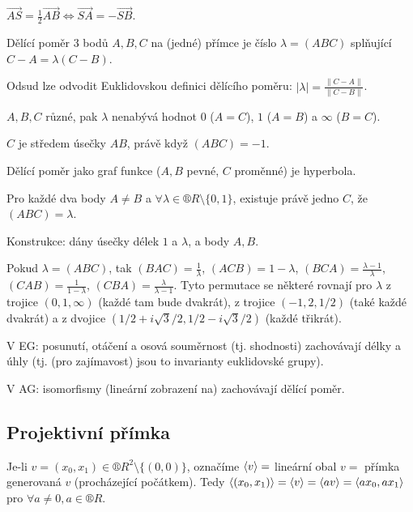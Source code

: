 \documentclass[12pt]{article}					%
\begin{document}
\begin{poznamka}
	$\vec{AS} = \frac{1}{2} \vec{AB} \Leftrightarrow \vec{SA} = -\vec{SB}$.
\end{poznamka}

\begin{definice}
	Dělící poměr 3 bodů $A, B, C$ na (jedné) přímce je číslo $λ = (ABC)$ splňující $C - A = λ(C - B)$.

	\begin{poznamkain}
		Odsud lze odvodit Euklidovskou definici dělícího poměru: $|λ| = \frac{\|C - A\|}{\|C - B\|}$.

		$A, B, C$ různé, pak $λ$ nenabývá hodnot $0$ ($A = C$), $1$ ($A = B$) a $∞$ ($B = C$).

		$C$ je středem úsečky $AB$, právě když $(ABC) = -1$.

		Dělící poměr jako graf funkce ($A, B$ pevné, $C$ proměnné) je hyperbola.

		Pro každé dva body $A ≠ B$ a $\forall λ \in ®R \setminus \{0, 1\}$, existuje právě jedno $C$, že $(ABC) = λ$.

		Konstrukce: dány úsečky délek $1$ a $λ$, a body $A, B$.

		Pokud $λ = (ABC)$, tak $(BAC) = \frac{1}{λ}$, $(ACB) = 1 - λ$, $(BCA) = \frac{λ - 1}{λ}$, $(CAB) = \frac{1}{1 - λ}$, $(CBA) = \frac{λ}{λ - 1}$. Tyto permutace se některé rovnají pro $λ$ z trojice $(0, 1, ∞)$ (každé tam bude dvakrát), z trojice $(-1, 2, 1 / 2)$ (také každé dvakrát) a z dvojice $(1 / 2 + i\sqrt{3}/2, 1 / 2 - i\sqrt{3}/2)$ (každé třikrát).
	\end{poznamkain}
\end{definice}

\begin{poznamka}
	V EG: posunutí, otáčení a osová souměrnost (tj. shodnosti) zachovávají délky a úhly (tj. (pro zajímavost) jsou to invarianty euklidovské grupy).

	V AG: isomorfismy (lineární zobrazení na) zachovávají dělící poměr.
\end{poznamka}

\subsection{Projektivní přímka}
\begin{definice}[Označení]
	Je-li $v = (x_0, x_1) \in ®R^2 \setminus \{(0, 0)\}$, označíme $\left\langle v\right\rangle =$ lineární obal $v =$ přímka generovaná $v$ (procházející počátkem). Tedy $\left\langle(x_0, x_1)\right\rangle = \left\langle v\right\rangle = \left\langle av\right\rangle = \left\langle ax_0, ax_1\right\rangle$ pro $\forall a ≠ 0, a \in ®R$.
\end{definice}
\end{document}
